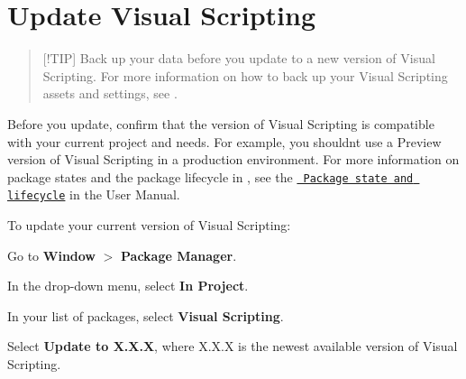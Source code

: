 \chapter{Update Visual Scripting}
\hypertarget{md__library_2_package_cache_2com_8unity_8visualscripting_0d1_89_82_2_documentation_0i_2vs-update}{}\label{md__library_2_package_cache_2com_8unity_8visualscripting_0d1_89_82_2_documentation_0i_2vs-update}
\label{md__library_2_package_cache_2com_8unity_8visualscripting_0d1_89_82_2_documentation_0i_2vs-update_autotoc_md2129}%
%
 \begin{quote}
\mbox{[}!\+TIP\mbox{]} Back up your data before you update to a new version of Visual Scripting. For more information on how to back up your Visual Scripting assets and settings, see . \end{quote}
Before you update, confirm that the version of Visual Scripting is compatible with your current project and needs. For example, you shouldn\textquotesingle{}t use a Preview version of Visual Scripting in a production environment. For more information on package states and the package lifecycle in , see the \href{https://docs.unity3d.com/Manual/upm-lifecycle.html}{\texttt{ Package state and lifecycle}} in the  User Manual.

To update your current version of Visual Scripting\+:


\begin{DoxyEnumerate}
\item Go to {\bfseries{Window}} \texorpdfstring{$>$}{>} {\bfseries{Package Manager}}.
\item In the {\bfseries{}} drop-\/down menu, select {\bfseries{In Project}}.
\item In your list of packages, select {\bfseries{Visual Scripting}}.
\item Select {\bfseries{Update to {\ttfamily X.\+X.\+X}}}, where {\ttfamily X.\+X.\+X} is the newest available version of Visual Scripting. 
\end{DoxyEnumerate}